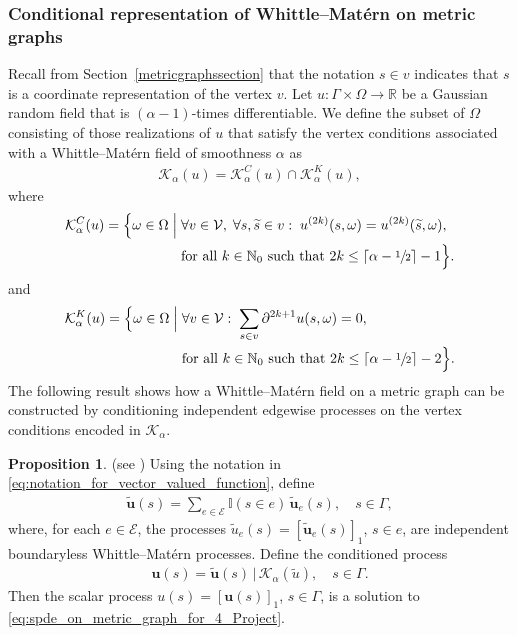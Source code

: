 \documentclass[11pt,a4paper]{article}
\theoremstyle{plain}
\theoremstyle{definition}
\newtheorem{proposition}{Proposition}
\begin{document}
\subsubsection{Conditional representation of Whittle--Matérn on metric graphs}

Recall from Section~\ref{metricgraphssection} that the notation $s \in v$ indicates that $s$ is a coordinate representation of the vertex $v$. Let $u \colon \Gamma \times \Omega \to \mathbb{R}$ be a Gaussian random field that is $(\alpha - 1)$-times differentiable. We define the subset of $\Omega$ consisting of those realizations of $u$ that satisfy the vertex conditions associated with a Whittle--Matérn field of smoothness $\alpha$ as
\begin{align*}
    \mathcal{K}_\alpha(u) = \mathcal{K}^C_\alpha(u)\cap \mathcal{K}^K_\alpha(u),
\end{align*}
where 
\begin{align*}
\mathcal{K}^C_\alpha(u) 
= \Big\{ \omega \in \Omega \;\Big|\;
&\forall v \in \mathcal{V}, \;\forall s, \widetilde{s} \in v:\;
u^{(2k)}(s,\omega) = u^{(2k)}(\widetilde{s},\omega),\notag \\
&\text{for all } k \in \mathbb{N}_0 \text{ such that } 
2k \leq \left\lceil \alpha - \sfrac{1}{2} \right\rceil - 1
\Big\}.
\end{align*}
and
\begin{align*}
\mathcal{K}^K_\alpha(u) 
= \Big\{ \omega \in \Omega \;\Big|\;
&\forall v \in \mathcal{V}:\;
\sum_{s\in v}\partial^{2k+1}u(s,\omega) = 0,\notag \\
&\text{for all } k \in \mathbb{N}_0 \text{ such that } 
2k \leq \left\lceil \alpha - \sfrac{1}{2} \right\rceil - 2
\Big\}.
\end{align*}
The following result shows how a Whittle--Matérn field on a metric graph can be constructed by conditioning independent edgewise processes on the vertex conditions encoded in $\mathcal{K}_\alpha$.

\begin{proposition}\textnormal{(see \cite[Theorem~4]{Bolin2023Statistical})}
\label{pro:boundaryless_representation_of_whittle_matern}
Using the notation in \eqref{eq:notation_for_vector_valued_function}, define
\begin{align*}
    \widetilde{\boldsymbol{u}}(s) 
    = \sum_{e\in\mathcal{E}} \mathbb{I}(s \in e)\,\widetilde{\boldsymbol{u}}_e(s), 
    \quad s \in \Gamma,
\end{align*}
where, for each $e \in \mathcal{E}$, the processes $\widetilde{u}_e(s) = [\widetilde{\boldsymbol{u}}_e(s)]_1$, $s \in e$, are independent boundaryless Whittle--Matérn processes. Define the conditioned process
\begin{align}
\label{eq:process_u_defined_as_conditioned}
    \boldsymbol{u}(s) = \widetilde{\boldsymbol{u}}(s)\, \big| \, \mathcal{K}_\alpha(\widetilde{u}), 
    \quad s \in \Gamma.
\end{align}
Then the scalar process $u(s) = [\boldsymbol{u}(s)]_1$, $s \in \Gamma$, is a solution to \eqref{eq:spde_on_metric_graph_for_4_Project}.
\end{proposition}
\end{document}
